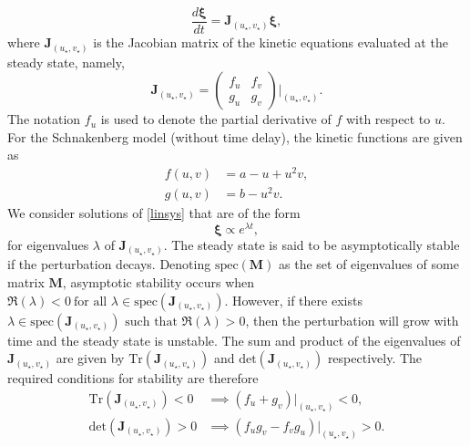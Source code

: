 \begin{equation}\label{linsys}
\frac{d\pmb{\xi}}{dt}=\textbf{J}_{(u_\star,v_\star)}\pmb{\xi},
\end{equation}
where $\textbf{J}_{(u_\star,v_\star)}$ is the Jacobian matrix of the kinetic equations evaluated at the steady state, namely,
$$
\textbf{J}_{(u_\star,v_\star)}=\begin{pmatrix}f_u&f_v\\g_u&g_v\end{pmatrix}\Bigg|_{(u_\star,v_\star)}.
$$
The notation $f_u$ is used to denote the partial derivative of $f$ with respect to $u$. For the Schnakenberg model (without time delay), the kinetic functions are given as
\begin{align*}
f(u,v)&=a-u+u^2v,\\
g(u,v)&=b-u^2v.
\end{align*}
We consider solutions of \eqref{linsys} that are of the form
$$
\pmb{\xi}\propto e^{\lambda t},
$$
for eigenvalues $\lambda$ of $\textbf{J}_{(u_\star,v_\star)}$. The steady state is said to be asymptotically stable if the perturbation decays.
Denoting $\text{spec}(\textbf{M})$ as the set of eigenvalues of some matrix $\textbf{M}$, asymptotic stability occurs when $\Re(\lambda)<0 \ \text{for all }\lambda\in \text{spec}(\textbf{J}_{(u_\star,v_\star)})$. However, if there exists $\lambda\in \text{spec}(\textbf{J}_{(u_\star,v_\star)})\text{ such that } \Re(\lambda)>0$,
then the perturbation will grow with time and the steady state is unstable. The sum and product of the eigenvalues of $\textbf{J}_{(u_\star,v_\star)}$
are given by $\text{Tr}(\textbf{J}_{(u_\star,v_\star)})$ and $\text{det}(\textbf{J}_{(u_\star,v_\star)})$ respectively. The required conditions for stability are therefore
\begin{equation}\label{cond1}
    \begin{split}
\text{Tr}(\textbf{J}_{(u_\star,v_\star)})<0 &\implies (f_u+g_v)\big|_{(u_\star,v_\star)}<0, \\
\text{det}(\textbf{J}_{(u_\star,v_\star)})>0 &\implies (f_ug_v-f_vg_u)\big|_{(u_\star,v_\star)}>0.
\end{split}
\end{equation}

